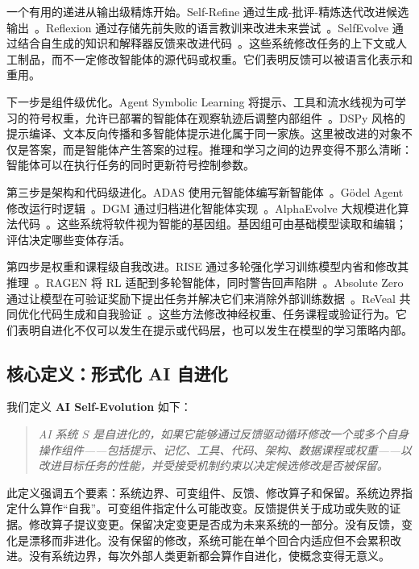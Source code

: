一个有用的递进从输出级精炼开始。Self-Refine 通过生成-批评-精炼迭代改进候选输出~\citep{selfrefine2023}。Reflexion 通过存储先前失败的语言教训来改进未来尝试~\citep{reflexion2023}。SelfEvolve 通过结合自生成的知识和解释器反馈来改进代码~\citep{selfevolve2023}。这些系统修改任务的上下文或人工制品，而不一定修改智能体的源代码或权重。它们表明反馈可以被语言化表示和重用。

下一步是组件级优化。Agent Symbolic Learning 将提示、工具和流水线视为可学习的符号权重，允许已部署的智能体在观察轨迹后调整内部组件~\citep{agentsymboliclearning2024}。DSPy 风格的提示编译、文本反向传播和多智能体提示进化属于同一家族。这里被改进的对象不仅是答案，而是智能体产生答案的过程。推理和学习之间的边界变得不那么清晰：智能体可以在执行任务的同时更新符号控制参数。

第三步是架构和代码级进化。ADAS 使用元智能体编写新智能体~\citep{adas2025}。G\"{o}del Agent 修改运行时逻辑~\citep{godelagent2024}。DGM 通过归档进化智能体实现~\citep{darwingodelmachine2025}。AlphaEvolve 大规模进化算法代码~\citep{alphaevolve2025}。这些系统将软件视为智能的基因组。基因组可由基础模型读取和编辑；评估决定哪些变体存活。

第四步是权重和课程级自我改进。RISE 通过多轮强化学习训练模型内省和修改其推理~\citep{rise2024}。RAGEN 将 RL 适配到多轮智能体，同时警告回声陷阱~\citep{ragen2025}。Absolute Zero 通过让模型在可验证奖励下提出任务并解决它们来消除外部训练数据~\citep{absolutezero2025}。ReVeal 共同优化代码生成和自我验证~\citep{reveal2025}。这些方法修改神经权重、任务课程或验证行为。它们表明自进化不仅可以发生在提示或代码层，也可以发生在模型的学习策略内部。

\subsection{核心定义：形式化 AI 自进化}\label{sec:intro-definition}

我们定义 \textbf{AI Self-Evolution} 如下：

\begin{quote}
\textit{AI 系统 $S$ 是自进化的，如果它能够通过反馈驱动循环修改一个或多个自身操作组件——包括提示、记忆、工具、代码、架构、数据课程或权重——以改进目标任务的性能，并受接受机制约束以决定候选修改是否被保留。}
\end{quote}

此定义强调五个要素：系统边界、可变组件、反馈、修改算子和保留。系统边界指定什么算作``自我''。可变组件指定什么可能改变。反馈提供关于成功或失败的证据。修改算子提议变更。保留决定变更是否成为未来系统的一部分。没有反馈，变化是漂移而非进化。没有保留的修改，系统可能在单个回合内适应但不会累积改进。没有系统边界，每次外部人类更新都会算作自进化，使概念变得无意义。

